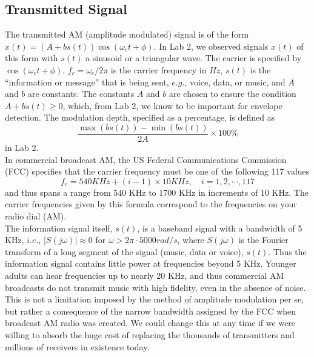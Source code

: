 \documentclass{article}
\begin{document}
\subsection{Transmitted Signal}
The transmitted AM (amplitude modulated) signal is of the form $x(t) = ( A + bs(t))\cos(\omega_ct + \phi)$. In Lab 2, we observed signals $x(t)$ of this form with $s(t)$ a sinusoid or a triangular wave. The carrier is specified by $\cos(\omega_ct + \phi)$, $f_c = \omega_c/2\pi$ is the carrier frequency in $Hz$, $s(t)$ is the “information or message” that is being sent, $e.g.$, voice, data, or music, and $A$ and $b$ are constants. The constants $A$ and $b$ are chosen to ensure the condition $A + bs(t) \ge 0$, which, from Lab 2, we know to be important for envelope detection. The modulation depth, specified as a percentage, is defined as
$$\frac{\max(bs(t))-\min(bs(t))}{2A}\times 100\%$$
in Lab 2.\\
In commercial broadcast AM, the US Federal Communications Commission (FCC) specifies that the carrier frequency must be one of the following 117 values
$$f_c = 540 KHz + (i-1)\times 10 KHz, \quad i = 1, 2, \cdots, 117$$
and thus spans a range from 540 KHz to 1700 KHz in increments of 10 KHz. The carrier frequencies given by this formula correspond to the frequencies on your radio dial (AM).\\
The information signal itself, $s(t)$, is a baseband signal with a bandwidth of 5 KHz, $i.e.$, $| S(j\omega) | \approx 0$ for $\omega > 2\pi \cdot 5000 rad/s$, where $S(j\omega)$ is the Fourier transform of a long segment of the signal (music, data or voice), $s(t)$. Thus the information signal contains little power at frequencies beyond 5 KHz. Younger adults can hear frequencies up to nearly 20 KHz, and thus commercial AM broadcasts do not transmit music with high fidelity, even in the absence of noise. This is not a limitation imposed by the method of amplitude modulation per se, but rather a consequence of the narrow bandwidth assigned by the FCC when broadcast
AM radio was created. We could change this at any time if we were willing to absorb the huge cost of replacing the thousands of transmitters and millions of receivers in existence today.
\end{document}
